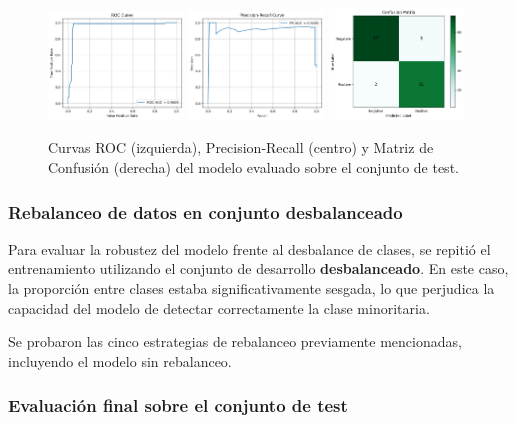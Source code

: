 \documentclass[11pt]{article}
\begin{document}
\begin{figure}[H]
    \centering
    \includegraphics[width=0.32\textwidth]{figures/test_roc.png}
    \hfill
    \includegraphics[width=0.32\textwidth]{figures/test_pr.png}
    \hfill
    \includegraphics[width=0.32\textwidth]{figures/test_confusion_matrix.png}
    \caption{Curvas ROC (izquierda), Precision-Recall (centro) y Matriz de Confusión (derecha) del modelo evaluado sobre el conjunto de test.}
    \label{fig:test_curves}
\end{figure}

\subsubsection*{Rebalanceo de datos en conjunto desbalanceado}

Para evaluar la robustez del modelo frente al desbalance de clases, se repitió el entrenamiento utilizando el conjunto de desarrollo \textbf{desbalanceado}. En este caso, la proporción entre clases estaba significativamente sesgada, lo que perjudica la capacidad del modelo de detectar correctamente la clase minoritaria.

Se probaron las cinco estrategias de rebalanceo previamente mencionadas, incluyendo el modelo sin rebalanceo.

\subsubsection*{Evaluación final sobre el conjunto de test}
\end{document}
